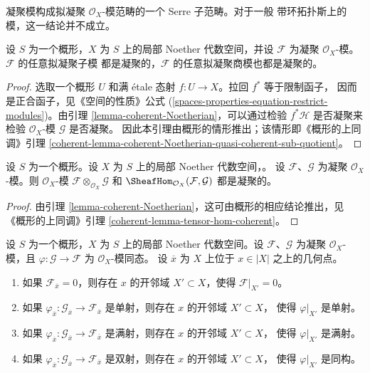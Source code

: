 \noindent
凝聚模构成拟凝聚 $\mathcal{O}_X$-模范畴的一个 Serre 子范畴。对于一般
带环拓扑斯上的模，这一结论并不成立。

\begin{lemma}
\label{lemma-coherent-Noetherian-quasi-coherent-sub-quotient}
设 $S$ 为一个概形，$X$ 为 $S$ 上的局部 Noether 代数空间，并设
$\mathcal{F}$ 为凝聚 $\mathcal{O}_X$-模。$\mathcal{F}$ 的任意拟凝聚子模
都是凝聚的，$\mathcal{F}$ 的任意拟凝聚商模也都是凝聚的。
\end{lemma}

\begin{proof}
选取一个概形 $U$ 和满 \'etale 态射 $f : U \to X$。拉回 $f^*$ 等于限制函子，
因而是正合函子，见《空间的性质》公式
(\ref{spaces-properties-equation-restrict-modules})。由引理
\ref{lemma-coherent-Noetherian}，可以通过检验 $f^*\mathcal{H}$ 是否凝聚来
检验 $\mathcal{O}_X$-模 $\mathcal{G}$ 是否凝聚。%
因此本引理由概形的情形推出；该情形即《概形的上同调》引理
\ref{coherent-lemma-coherent-Noetherian-quasi-coherent-sub-quotient}。
\end{proof}

\begin{lemma}
\label{lemma-tensor-hom-coherent}
设 $S$ 为一个概形。设 $X$ 为 $S$ 上的局部 Noether 代数空间，。%
设 $\mathcal{F}$、$\mathcal{G}$ 为凝聚 $\mathcal{O}_X$-模。则
$\mathcal{O}_X$-模 $\mathcal{F} \otimes_{\mathcal{O}_X} \mathcal{G}$ 和
$\SheafHom_{\mathcal{O}_X}(\mathcal{F}, \mathcal{G})$ 都是凝聚的。
\end{lemma}

\begin{proof}
由引理 \ref{lemma-coherent-Noetherian}，这可由概形的相应结论推出，见
《概形的上同调》引理 \ref{coherent-lemma-tensor-hom-coherent}。
\end{proof}

\begin{lemma}
\label{lemma-local-isomorphism}
设 $S$ 为一个概形，$X$ 为 $S$ 上的局部 Noether 代数空间。设
$\mathcal{F}$、$\mathcal{G}$ 为凝聚 $\mathcal{O}_X$-模，且
$\varphi : \mathcal{G} \to \mathcal{F}$ 为 $\mathcal{O}_X$-模同态。
设 $\overline{x}$ 为 $X$ 上位于 $x \in |X|$ 之上的几何点。
\begin{enumerate}
\item 如果 $\mathcal{F}_{\overline{x}} = 0$，则存在 $x$ 的开邻域
$X' \subset X$，使得 $\mathcal{F}|_{X'} = 0$。
\item 如果 $\varphi_{\overline{x}} : \mathcal{G}_{\overline{x}} \to
\mathcal{F}_{\overline{x}}$ 是单射，则存在 $x$ 的开邻域 $X' \subset X$，
使得 $\varphi|_{X'}$ 是单射。
\item 如果 $\varphi_{\overline{x}} : \mathcal{G}_{\overline{x}} \to
\mathcal{F}_{\overline{x}}$ 是满射，则存在 $x$ 的开邻域 $X' \subset X$，
使得 $\varphi|_{X'}$ 是满射。
\item 如果 $\varphi_{\overline{x}} : \mathcal{G}_{\overline{x}} \to
\mathcal{F}_{\overline{x}}$ 是双射，则存在 $x$ 的开邻域 $X' \subset X$，
使得 $\varphi|_{X'}$ 是同构。
\end{enumerate}
\end{lemma}

